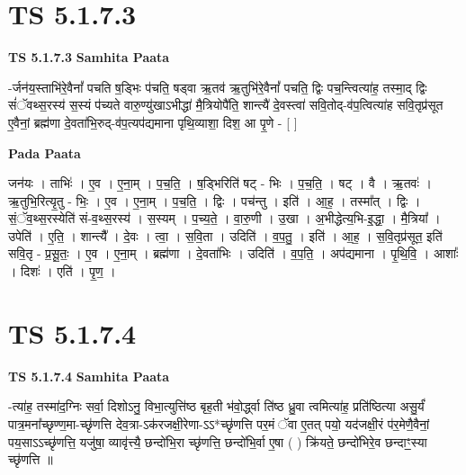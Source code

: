 \documentclass[17pt]{extarticle}
\begin{document}
\section*{ TS 5.1.7.3 }

\textbf{TS 5.1.7.3 } \newline
\textbf{Samhita Paata} \newline

-र्जन॑य॒स्ताभि॑रे॒वैनां᳚ पचति ष॒ड्भिः प॑चति॒ षड्वा ऋ॒तव॑ ऋ॒तुभि॑रे॒वैनां᳚ पचति॒ द्विः पच॒न्त्वित्या॑ह॒ तस्मा॒द् द्विः सं॑ॅवथ्स॒रस्य॑ स॒स्यं प॑च्यते वारु॒ण्यु॑खाऽभीद्धा॑ मै॒त्रियोपै॑ति॒ शान्त्यै॑ दे॒वस्त्वा॑ सवि॒तोद्-व॑प॒त्वित्या॑ह सवि॒तृप्र॑सूत ए॒वैनां॒ ब्रह्म॑णा दे॒वता॑भि॒रुद्-व॑प॒त्यप॑द्यमाना पृथि॒व्याशा॒ दिश॒ आ पृ॒णे - [  ] \newline

\textbf{Pada Paata} \newline

जन॑यः । ताभिः॑ । ए॒व । ए॒ना॒म् । प॒च॒ति॒ । ष॒ड्भिरिति॑ षट् - भिः । प॒च॒ति॒ । षट् । वै । ऋ॒तवः॑ । ऋ॒तुभि॒रित्यृ॒तु - भिः॒ । ए॒व । ए॒ना॒म् । प॒च॒ति॒ । द्विः । पच॑न्तु । इति॑ । आ॒ह॒ । तस्मा᳚त् । द्विः । सं॒ॅव॒थ्स॒रस्येति॑ सं-व॒थ्स॒रस्य॑ । स॒स्यम् । प॒च्य॒ते॒ । वा॒रु॒णी । उ॒खा । अ॒भीद्धेत्य॒भि-इ॒द्धा॒ । मै॒त्रिया᳚ । उपेति॑ । ए॒ति॒ । शान्त्यै᳚ । दे॒वः । त्वा॒ । स॒वि॒ता । उदिति॑ । व॒प॒तु॒ । इति॑ । आ॒ह॒ । स॒वि॒तृप्र॑सूत॒ इति॑ सवि॒तृ - प्र॒सू॒तः॒ । ए॒व । ए॒ना॒म् । ब्रह्म॑णा । दे॒वता॑भिः । उदिति॑ । व॒प॒ति॒ । अप॑द्यमाना । पृ॒थि॒वि॒ । आशाः᳚ । दिशः॑ । एति॑ । पृ॒ण॒ ।  \newline




\section*{ TS 5.1.7.4 }

\textbf{TS 5.1.7.4 } \newline
\textbf{Samhita Paata} \newline

-त्या॑ह॒ तस्मा॑द॒ग्निः सर्वा॒ दिशोऽनु॒ विभा॒त्युत्ति॑ष्ठ बृह॒ती भ॑वो॒र्द्ध्वा ति॑ष्ठ ध्रु॒वा त्वमित्या॑ह॒ प्रति॑ष्ठित्या असु॒र्यं॑ पात्र॒मना᳚च्छृण्ण॒मा-च्छृ॑णत्ति देव॒त्रा-ऽक॑रजक्षी॒रेणा-ऽऽ*च्छृ॑णत्ति पर॒मं ॅवा ए॒तत् पयो॒ यद॑जक्षी॒रं प॑र॒मेणै॒वैनां॒ पय॒साऽऽच्छृ॑णत्ति॒ यजु॑षा॒ व्यावृ॑त्त्यै॒ छन्दो॑भि॒रा च्छृ॑णत्ति॒ छन्दो॑भि॒र्वा ए॒षा ( ) क्रि॑यते॒ छन्दो॑भिरे॒व छन्दाꣳ॒॒स्या च्छृ॑णत्ति ॥ \newline
\end{document}
